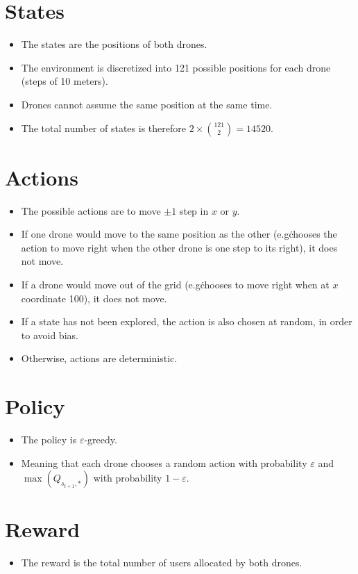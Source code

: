 \documentclass{IEEEtran}
\begin{document}
\section{States}
\begin{itemize}
    \item The states are the positions of both drones.
    \item The environment is discretized into 121 possible positions for each drone (steps of 10 meters).
    \item Drones cannot assume the same position at the same time.
    \item The total number of states is therefore $2 \times \binom{121}{2} = 14520$.
\end{itemize}
\section{Actions}
\begin{itemize}
    \item The possible actions are to move $\pm 1$ step in $x$ or $y$.
    \item If one drone would move to the same position as the other (e.g\. chooses the action to move right when the other drone is one step to its right), it does not move.
    \item If a drone would move out of the grid (e.g\. chooses to move right when at $x$ coordinate 100), it does not move.
    \item If a state has not been explored, the action is also chosen at random, in order to avoid bias.
    \item Otherwise, actions are deterministic.
\end{itemize}
\section{Policy}
\begin{itemize}
    \item The policy is $\varepsilon$-greedy.
    \item Meaning that each drone chooses a random action with probability $\varepsilon$ and $\max (Q_{s_{t+1}, *})$ with probability $1 - \varepsilon$.
\end{itemize}
\section{Reward}
\begin{itemize}
    \item The reward is the total number of users allocated by both drones.
\end{itemize}
\end{document}
